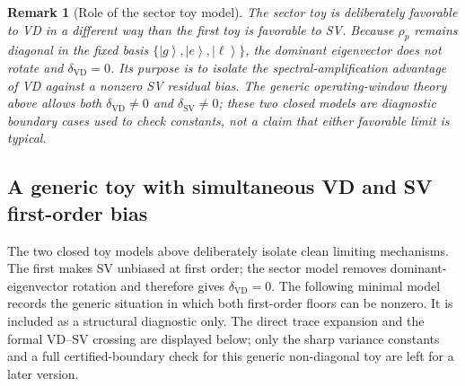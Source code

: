 \documentclass[11pt]{article}
\newtheorem{remark}{Remark}
\newcommand{\1}{\mathbf{1}}
\newcommand{\ket}[1]{\left|#1\right\rangle}
\begin{document}
\begin{remark}[Role of the sector toy model]
The sector toy is deliberately favorable to VD in a different way than the first toy is favorable to SV\@.  Because \(\rho_p\) remains diagonal in the fixed basis \(\{\ket g,\ket e,\ket\ell\}\), the dominant eigenvector does not rotate and \(\delta_{\mathrm{VD}}=0\).  Its purpose is to isolate the spectral-amplification advantage of VD against a nonzero SV residual bias.  The generic operating-window theory above allows both \(\delta_{\mathrm{VD}}\ne0\) and \(\delta_{\mathrm{SV}}\ne0\); these two closed models are diagnostic boundary cases used to check constants, not a claim that either favorable limit is typical.
\end{remark}


\subsection{A generic toy with simultaneous VD and SV first-order bias}
\label{subsec:generic_toy_v10}

The two closed toy models above deliberately isolate clean limiting mechanisms.  The first makes SV unbiased at first order; the sector model removes dominant-eigenvector rotation and therefore gives \(\delta_{\mathrm{VD}}=0\).  The following minimal model records the generic situation in which both first-order floors can be nonzero.  It is included as a structural diagnostic only.  The direct trace expansion and the formal VD--SV crossing are displayed below; only the sharp variance constants and a full certified-boundary check for this generic non-diagonal toy are left for a later version.
\end{document}
